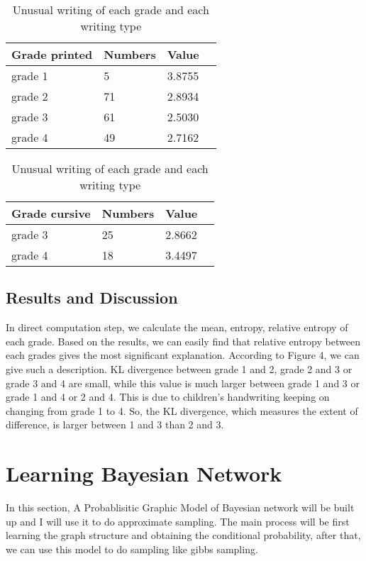 \documentclass{article}
\begin{document}
\begin{table}[t]
\vskip 0.15in
\begin{center}
		\begin{tabular}{ | l | l | l | p{5cm} |}
				\hline
				Grade printed & Numbers & Value \\ \hline
				grade 1 	& 5  & 3.8755    \\ \hline
				grade 2 	& 71 & 2.8934    \\ \hline
				grade 3 	& 61 & 2.5030    \\ \hline
				grade 4 	& 49 & 2.7162  \\
				\hline
		\end{tabular}
\end{center}
\vskip -0.5in
\begin{center}
		\begin{tabular}{ | l | l | l | p{5cm} |}
				\hline
				Grade cursive & Numbers & Value \\ \hline
				grade 3 	& 25 & 2.8662    \\ \hline
				grade 4 	& 18 & 3.4497 	 \\
				\hline
		\end{tabular}
\end{center}
\caption{Unusual writing of each grade and each writing type}
\vskip -0.1in
\end{table}
\subsection{Results and Discussion}
In direct computation step, we calculate the mean, entropy, relative entropy of each grade.
Based on the results, we can easily find that relative entropy between each grades gives
the most significant explanation. According to Figure 4, we can give such a description.
KL divergence between grade 1 and 2, grade 2 and 3 or grade 3 and 4 are small, while this
value is much larger between grade 1 and 3 or grade 1 and 4 or 2 and 4. This is due to children's
handwriting keeping on changing from grade 1 to 4. So, the KL divergence, which measures the extent
of difference, is larger between 1 and 3 than 2 and 3.
\section{Learning Bayesian Network}
In this section, A Probablisitic Graphic Model of Bayesian network will be built up and I will use it to do approximate
sampling. The main process will be first learning the graph structure and obtaining the conditional probability, after
that, we can use this model to do sampling like gibbs sampling.
\end{document}
